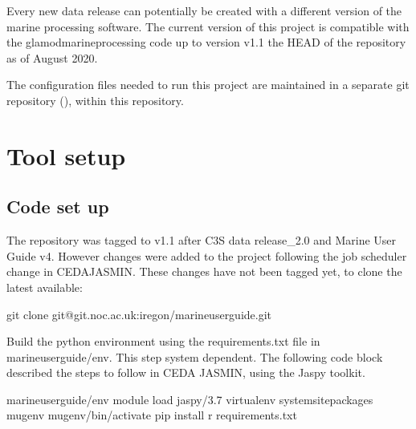 \documentclass[letterpaper,10pt,english]{sphinxmanual}
\begin{document}
Every new data release can potentially be created with a different version of
the marine processing software. The current version of this project is
compatible with the glamod\sphinxhyphen{}marine\sphinxhyphen{}processing code up to version v1.1 the HEAD
of the repository as of August 2020.

The configuration files needed to run this project are maintained in a separate
git repository (), within
this repository.


\chapter{Tool set\sphinxhyphen{}up}
\label{\detokenize{index:tool-set-up}}

\section{Code set up}
\label{\detokenize{index:code-set-up}}
The repository was tagged to v1.1 after C3S data release\_2.0 and Marine User
Guide v4. However changes were added to the project following the job scheduler
change in CEDA\sphinxhyphen{}JASMIN. These changes have not been tagged yet, to clone the
latest available:

\begin{sphinxVerbatim}[commandchars=\\\{\}]
git clone git@git.noc.ac.uk:iregon/marine\PYGZhy{}user\PYGZhy{}guide.git
\end{sphinxVerbatim}

Build the python environment using the requirements.txt file in
marine\sphinxhyphen{}user\sphinxhyphen{}guide/env. This step system dependent. The following code block
described the steps to follow in CEDA JASMIN, using the Jaspy toolkit.

\begin{sphinxVerbatim}[commandchars=\\\{\}]
 marine\PYGZhy{}user\PYGZhy{}guide/env
module load jaspy/3.7
virtualenv \PYGZhy{}\textendash{}system\PYGZhy{}site\PYGZhy{}packages mug\PYGZus{}env
 mug\PYGZus{}env/bin/activate
pip install \PYGZhy{}r requirements.txt
\end{sphinxVerbatim}
\end{document}
